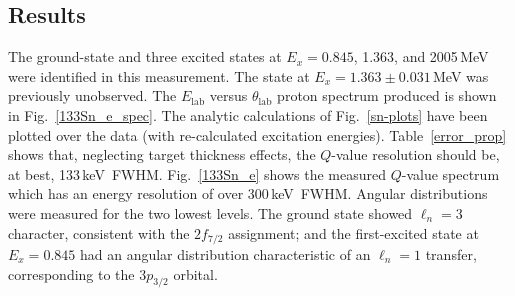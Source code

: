 \subsection{Results}
\label{orrubaresults}
The ground-state and three excited states at $E_x=0.845$, 1.363, and 2005\,MeV were identified in this measurement. The state at $E_x=1.363\pm0.031$\,MeV was previously unobserved.  The $E_\mathrm{lab}$ versus $\theta_\mathrm{lab}$ proton spectrum produced is shown in Fig.~\ref{133Sn_e_spec}.  The analytic calculations of Fig.~\ref{sn-plots} have been plotted over the data (with re-calculated excitation energies).  Table~\ref{error_prop} shows that, neglecting target thickness effects, the $Q$-value resolution should be, at best, 133\,keV~FWHM.  Fig.~\ref{133Sn_e} shows the measured $Q$-value spectrum which has an energy resolution of over 300\,keV~FWHM.  Angular distributions were measured for the two lowest levels.  The ground state showed $\ell_n=3$ character, consistent with the $2f_{7/2}$ assignment; and the first-excited state at $E_x=0.845$ had an angular distribution characteristic of an $\ell_n=1$ transfer, corresponding to the $3p_{3/2}$ orbital.

